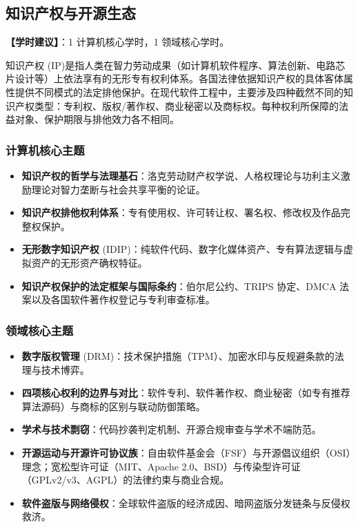 \subsection{知识产权与开源生态}
\textbf{【学时建议】}：1 计算机核心学时，1 领域核心学时。

知识产权 (IP)是指人类在智力劳动成果（如计算机软件程序、算法创新、电路芯片设计等）上依法享有的无形专有权利体系。各国法律依据知识产权的具体客体属性提供不同模式的法定排他保护。在现代软件工程中，主要涉及四种截然不同的知识产权类型：专利权、版权/著作权、商业秘密以及商标权。每种权利所保障的法益对象、保护期限与排他效力各不相同。

\subsubsection{计算机核心主题}
\begin{itemize}
    \item \textbf{知识产权的哲学与法理基石}：洛克劳动财产权学说、人格权理论与功利主义激励理论对智力垄断与社会共享平衡的论证。
    \item \textbf{知识产权排他权利体系}：专有使用权、许可转让权、署名权、修改权及作品完整权保护。
    \item \textbf{无形数字知识产权} (IDIP)：纯软件代码、数字化媒体资产、专有算法逻辑与虚拟资产的无形资产确权特征。
    \item \textbf{知识产权保护的法定框架与国际条约}：伯尔尼公约、TRIPS 协定、DMCA 法案以及各国软件著作权登记与专利审查标准。
\end{itemize}

\subsubsection{领域核心主题}
\begin{itemize}
    \item \textbf{数字版权管理} (DRM)：技术保护措施（TPM）、加密水印与反规避条款的法理与技术博弈。
    \item \textbf{四项核心权利的边界与对比}：软件专利、软件著作权、商业秘密（如专有推荐算法源码）与商标的区别与联动防御策略。
    \item \textbf{学术与技术剽窃}：代码抄袭判定机制、开源合规审查与学术不端防范。
    \item \textbf{开源运动与开源许可协议族}：自由软件基金会（FSF）与开源倡议组织（OSI）理念；宽松型许可证（MIT、Apache 2.0、BSD）与传染型许可证（GPLv2/v3、AGPL）的法律约束与商业合规。
    \item \textbf{软件盗版与网络侵权}：全球软件盗版的经济成因、暗网盗版分发链条与反侵权救济。
\end{itemize}


